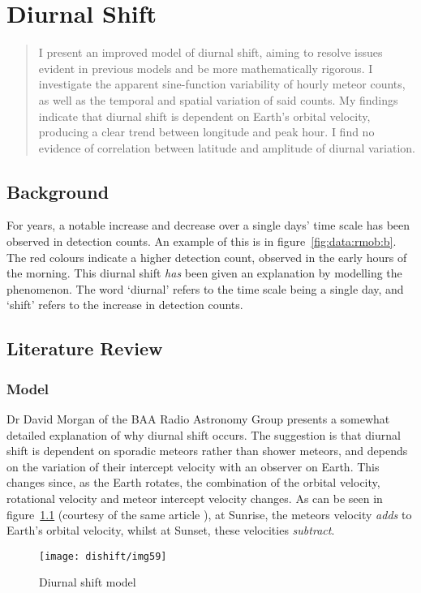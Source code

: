 \chapter{Diurnal Shift}
\label{chap:diurnalshift}
\begin{strip}
	\begin{minipage}{\textwidth}
		\begin{abstract}
			I present an improved model of diurnal shift, aiming to resolve issues evident in previous models and be more mathematically rigorous. I investigate the apparent sine-function variability of hourly meteor counts, as well as the temporal and spatial variation of said counts. My findings indicate that diurnal shift is dependent on Earth's orbital velocity, producing a clear trend between longitude and peak hour. I find no evidence of correlation between latitude and amplitude of diurnal variation.
		\end{abstract}
	\end{minipage}
\end{strip}
\section{Background}
For years, a notable increase and decrease over a single days' time scale has been observed in detection counts. An example of this is in figure~\ref{fig:data:rmob:b}. The red colours indicate a higher detection count, observed in the early hours of the morning. This diurnal shift {\it has} been given an explanation by modelling the phenomenon. The word `diurnal' refers to the time scale being a single day, and `shift' refers to the increase in detection counts. 
\section{Literature Review}
\subsection{Model}
Dr David Morgan of the BAA Radio Astronomy Group presents a somewhat detailed explanation \cite{baa} of why diurnal shift occurs. The suggestion is that diurnal shift is dependent on sporadic meteors rather than shower meteors, and depends on the variation of their intercept velocity with an observer on Earth. This changes since, as the Earth rotates, the combination of the orbital velocity, rotational velocity and meteor intercept velocity changes. As can be seen in figure~\ref{fig:dishift:model} (courtesy of the same article \cite{baa}), at Sunrise, the meteors velocity {\it adds} to Earth's orbital velocity, whilst at Sunset, these velocities {\it subtract}. 
\begin{figure}[h!]
	\centering
	\texttt{[image: dishift/img59]}
	\caption{Diurnal shift model
		\label{fig:dishift:model}}
\end{figure}
